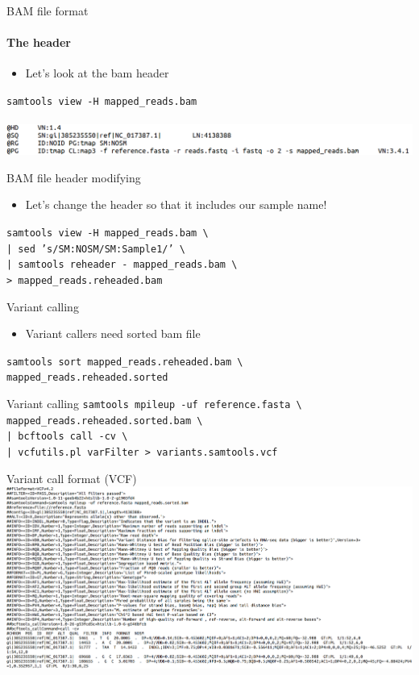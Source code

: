 \documentclass{beamer}
\newcommand{\sortbam}[2]{\texttt{samtools sort #1 \textbackslash \\ #2}}
\newcommand{\reheader}[2]{\texttt{samtools view -H #1 \textbackslash \\
    | sed 's/SM:NOSM/SM:Sample1/' \textbackslash \\
    | samtools reheader - mapped\_reads.bam \textbackslash \\
    > #2
  }
}
\newcommand{\samtoolssnp}[3]{\texttt{samtools mpileup -uf #1 \textbackslash \\
    #2 \textbackslash \\
    | bcftools call -cv \textbackslash \\
    | vcfutils.pl varFilter > #3
  }
}
\begin{document}
\begin{frame}{BAM file format}
  \framesubtitle{The header}
    \begin{itemize}
      \item Let's look at the bam header
     \end{itemize}
  \texttt{samtools view -H mapped\_reads.bam} \\~\\
  \includegraphics[width=\linewidth, keepaspectratio]{pic/bam_head.png}
\end{frame}

\begin{frame}{BAM file header modifying}
  \begin{itemize}
    \item Let's change the header so that it includes our sample name!
  \end{itemize}
  \reheader{mapped\_reads.bam}{mapped\_reads.reheaded.bam}
\end{frame}



\begin{frame} {Variant calling}
  \begin{itemize}
    \item Variant callers need sorted bam file
  \end{itemize}
  \sortbam{mapped\_reads.reheaded.bam}{mapped\_reads.reheaded.sorted}
\end{frame}

\begin{frame}{Variant calling}
  \samtoolssnp{reference.fasta}{mapped\_reads.reheaded.sorted.bam}{variants.samtools.vcf}
\end{frame}

\begin{frame}{Variant call format (VCF)}
  \includegraphics[width=\paperwidth, keepaspectratio]{pic/vcf.png}
\end{frame}
\end{document}

